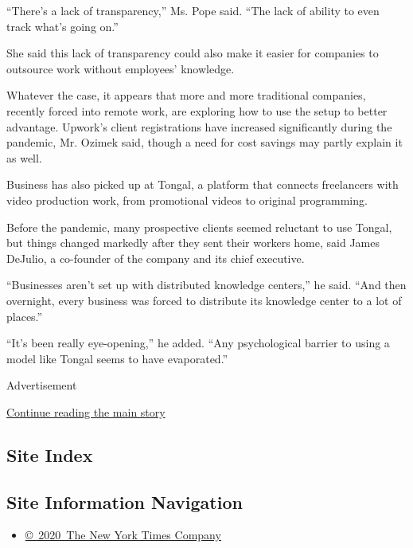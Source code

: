 ``There's a lack of transparency,'' Ms. Pope said. ``The lack of ability
to even track what's going on.''

She said this lack of transparency could also make it easier for
companies to outsource work without employees' knowledge.

Whatever the case, it appears that more and more traditional companies,
recently forced into remote work, are exploring how to use the setup to
better advantage. Upwork's client registrations have increased
significantly during the pandemic, Mr. Ozimek said, though a need for
cost savings may partly explain it as well.

Business has also picked up at Tongal, a platform that connects
freelancers with video production work, from promotional videos to
original programming.

Before the pandemic, many prospective clients seemed reluctant to use
Tongal, but things changed markedly after they sent their workers home,
said James DeJulio, a co-founder of the company and its chief executive.

``Businesses aren't set up with distributed knowledge centers,'' he
said. ``And then overnight, every business was forced to distribute its
knowledge center to a lot of places.''

``It's been really eye-opening,'' he added. ``Any psychological barrier
to using a model like Tongal seems to have evaporated.''

Advertisement

\protect\hyperlink{after-bottom}{Continue reading the main story}

\hypertarget{site-index}{%
\subsection{Site Index}\label{site-index}}

\hypertarget{site-information-navigation}{%
\subsection{Site Information
Navigation}\label{site-information-navigation}}

\begin{itemize}
\tightlist
\item
  \href{https://help.nytimes3xbfgragh.onion/hc/en-us/articles/115014792127-Copyright-notice}{©~2020~The
  New York Times Company}
\end{itemize}

